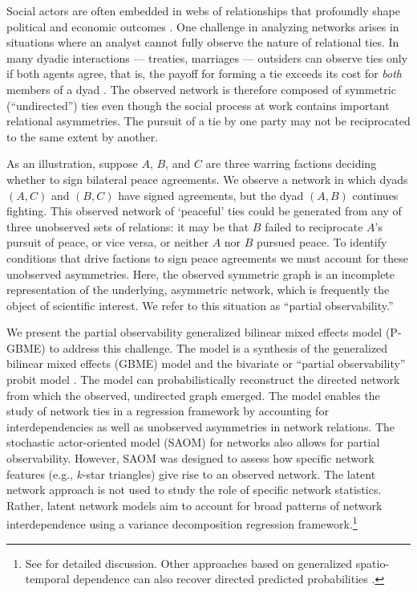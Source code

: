 \documentclass[a4paper, 12pt]{article}
\begin{document}
Social actors are often embedded in webs of relationships that profoundly shape political and economic outcomes \citep{franzese:hays:2008,ward:etal:2011}. One challenge in analyzing networks arises in situations where an analyst cannot fully observe the nature of relational ties. In many dyadic interactions --- treaties, marriages --- outsiders can observe ties only if both agents agree, that is, the payoff for forming a tie exceeds its cost for \emph{both} members of a dyad \citep{jackson:wolinsky:1996}. The observed network is therefore composed of symmetric (``undirected'') ties even though the social process at work contains important relational asymmetries. The pursuit of a tie by one party may not be reciprocated to the same extent by another.

As an illustration, suppose $A$, $B$, and $C$ are three warring factions deciding whether to sign bilateral peace agreements. We observe a network in which dyads $(A, C)$ and $(B, C)$ have signed agreements, but the dyad $(A, B)$ continues fighting. This observed network of `peaceful' ties could be generated from any of  three unobserved sets of relations: it may be that $B$ failed to reciprocate $A$'s pursuit of peace, or vice versa, or neither $A$ nor $B$ pursued peace. To identify conditions that drive factions to sign peace agreements we must account for these unobserved asymmetries.  Here, the observed symmetric graph is an incomplete representation of the underlying, asymmetric network, which is frequently the object of scientific interest.  We refer to this situation as ``partial observability.'' 

We present the partial observability generalized bilinear mixed effects model (P-GBME) to address this challenge.  The model is a synthesis of the generalized bilinear mixed effects (GBME) model \citep{hoff:2005} and the bivariate or ``partial observability'' probit model \citep{poirier:1980, przeworski:vreel:2002}. The model can probabilistically reconstruct the directed network from which the observed, undirected graph emerged. The model enables the study of network ties in a regression framework by accounting for interdependencies as well as unobserved asymmetries in network relations. The stochastic actor-oriented model (SAOM) for networks \citep{snijders:pickup:2017} also allows for partial observability. However, SAOM was designed to assess how specific network features (e.g., $k$-star triangles) give rise to an observed network. The latent network approach is not used to study the role of specific network statistics.  Rather, latent network models aim to account for broad patterns of network interdependence using a variance decomposition regression framework.\footnote{See \citet{minhas:etal:2016:arxiv} for detailed discussion. Other approaches based on generalized spatio-temporal dependence can also recover directed predicted probabilities \citet{franzese:etal:2012}.}
\end{document}
